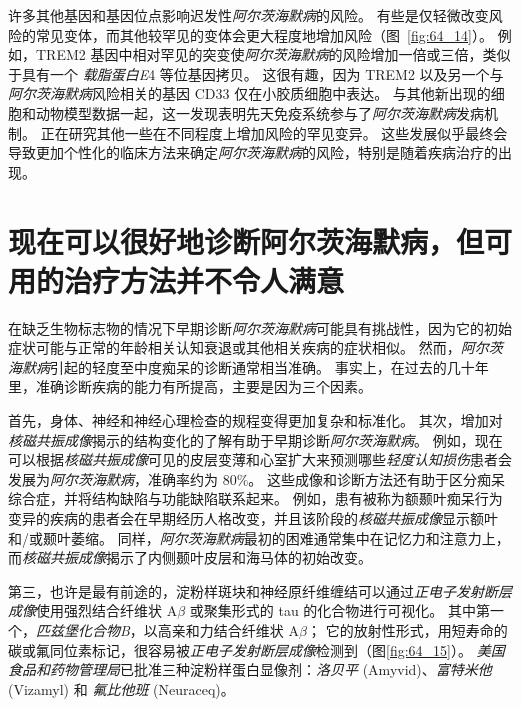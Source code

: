 许多其他基因和基因位点影响迟发性\textit{阿尔茨海默病}的风险。
有些是仅轻微改变风险的常见变体，而其他较罕见的变体会更大程度地增加风险（图~\ref{fig:64_14}）。
例如，TREM2 基因中相对罕见的突变使\textit{阿尔茨海默病}的风险增加一倍或三倍，类似于具有一个 \textit{载脂蛋白E}4 等位基因拷贝。
这很有趣，因为 TREM2 以及另一个与\textit{阿尔茨海默病}风险相关的基因 CD33 仅在小胶质细胞中表达。
与其他新出现的细胞和动物模型数据一起，这一发现表明先天免疫系统参与了\textit{阿尔茨海默病}发病机制。
正在研究其他一些在不同程度上增加风险的罕见变异。
这些发展似乎最终会导致更加个性化的临床方法来确定\textit{阿尔茨海默病}的风险，特别是随着疾病治疗的出现。



\section{现在可以很好地诊断阿尔茨海默病，但可用的治疗方法并不令人满意}

在缺乏生物标志物的情况下早期诊断\textit{阿尔茨海默病}可能具有挑战性，因为它的初始症状可能与正常的年龄相关认知衰退或其他相关疾病的症状相似。
然而，\textit{阿尔茨海默病}引起的轻度至中度痴呆的诊断通常相当准确。
事实上，在过去的几十年里，准确诊断疾病的能力有所提高，主要是因为三个因素。

首先，身体、神经和神经心理检查的规程变得更加复杂和标准化。
其次，增加对\textit{核磁共振成像}揭示的结构变化的了解有助于早期诊断\textit{阿尔茨海默病}。
例如，现在可以根据\textit{核磁共振成像}可见的皮层变薄和心室扩大来预测哪些\textit{轻度认知损伤}患者会发展为\textit{阿尔茨海默病}，准确率约为 80\%。
这些成像和诊断方法还有助于区分痴呆综合症，并将结构缺陷与功能缺陷联系起来。
例如，患有被称为额颞叶痴呆行为变异的疾病的患者会在早期经历人格改变，并且该阶段的\textit{核磁共振成像}显示额叶和/或颞叶萎缩。
同样，\textit{阿尔茨海默病}最初的困难通常集中在记忆力和注意力上，而\textit{核磁共振成像}揭示了内侧颞叶皮层和海马体的初始改变。


第三，也许是最有前途的，淀粉样斑块和神经原纤维缠结可以通过\textit{正电子发射断层成像}使用强烈结合纤维状 A$\beta$ 或聚集形式的 tau 的化合物进行可视化。
其中第一个，\textit{匹兹堡化合物B}，以高亲和力结合纤维状 A$\beta$；
它的放射性形式，用短寿命的碳或氟同位素标记，很容易被\textit{正电子发射断层成像}检测到（图\ref{fig:64_15}）。
\textit{美国食品和药物管理局}已批准三种淀粉样蛋白显像剂：\textit{洛贝平} (Amyvid)、\textit{富特米他} (Vizamyl) 和 \textit{氟比他班} (Neuraceq)。


